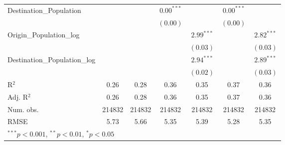 \begin{table}
\begin{center}
\begin{tabular}{l c c c c c c }
			Destination\_Population      &               &               & $0.00^{***}$  &                & $0.00^{***}$  &                \\
			&               &               & $(0.00)$      &                & $(0.00)$      &                \\
			Origin\_Population\_log      &               &               &               & $2.99^{***}$   &               & $2.82^{***}$   \\
			&               &               &               & $(0.03)$       &               & $(0.03)$       \\
			Destination\_Population\_log &               &               &               & $2.94^{***}$   &               & $2.89^{***}$   \\
			&               &               &               & $(0.02)$       &               & $(0.03)$       \\
			\hline
			R$^2$                        & 0.26          & 0.28          & 0.36          & 0.35           & 0.37          & 0.36           \\
			Adj. R$^2$                   & 0.26          & 0.28          & 0.36          & 0.35           & 0.37          & 0.36           \\
			Num. obs.                    & 214832        & 214832        & 214832        & 214832         & 214832        & 214832         \\
			RMSE                         & 5.73          & 5.66          & 5.35          & 5.39           & 5.28          & 5.35           \\
			\hline
			\multicolumn{7}{l}{\scriptsize{$^{***}p<0.001$, $^{**}p<0.01$, $^*p<0.05$}}
		\end{tabular}
		\label{table:coefficients2018Q3}
	\end{center}
\end{table}


